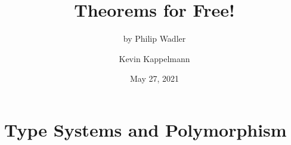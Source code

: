 \documentclass{beamer}
\title{Theorems for Free!} %
\subtitle{by Philip Wadler}
\author{Kevin Kappelmann} %
\institute[TU Munich]{Technical University of Munich}
\date{May 27, 2021} %
\begin{document}
\maketitle

\section{Type Systems and Polymorphism}






\end{document}
